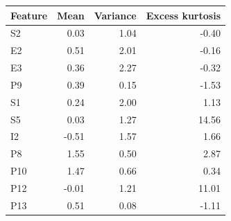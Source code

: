 \begin{tabular}{lrrr}
\toprule
Feature & Mean & Variance & Excess kurtosis \\
\midrule
S2 & 0.03 & 1.04 & -0.40 \\
E2 & 0.51 & 2.01 & -0.16 \\
E3 & 0.36 & 2.27 & -0.32 \\
P9 & 0.39 & 0.15 & -1.53 \\
S1 & 0.24 & 2.00 & 1.13 \\
S5 & 0.03 & 1.27 & 14.56 \\
I2 & -0.51 & 1.57 & 1.66 \\
P8 & 1.55 & 0.50 & 2.87 \\
P10 & 1.47 & 0.66 & 0.34 \\
P12 & -0.01 & 1.21 & 11.01 \\
P13 & 0.51 & 0.08 & -1.11 \\
\bottomrule
\end{tabular}

